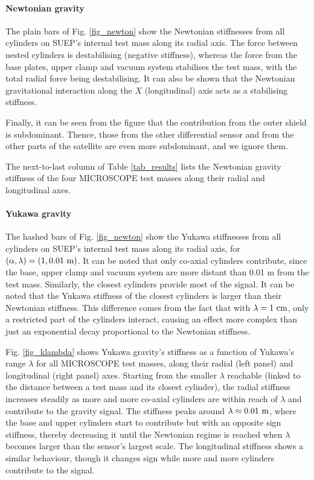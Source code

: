 \documentclass[12pt]{iopart}
\begin{document}
\paragraph{Newtonian gravity}

The plain bars of Fig. \ref{fig_newton} show the Newtonian stiffnesses from all cylinders on SUEP's internal test mass along its radial axis. The force between nested cylinders is destabilising (negative stiffness), whereas the force from the base plates, upper clamp and vacuum system stabilises the test mass, with the total radial force being destabilising. It can also be shown that the Newtonian gravitational interaction along the $X$ (longitudinal) axis acts as a stabilising stiffness.

Finally, it can be seen from the figure that the contribution from the outer shield is subdominant. Thence, those from  the other differential sensor and from the other parts of the satellite are even more subdominant, and we ignore them.


The next-to-last column of Table \ref{tab_results} lists the Newtonian gravity stiffness of the four MICROSCOPE test masses along their radial and longitudinal axes.




\paragraph{Yukawa gravity}

The hashed bars of Fig. \ref{fig_newton} show the Yukawa stiffnesses from all cylinders on SUEP's internal test mass along its radial axis, for $(\alpha, \lambda)=(1, 0.01~{\rm m})$. It can be noted that only co-axial cylinders contribute, since the base, upper clamp and vacuum system are more distant than 0.01 m from the test mass. Similarly, the closest cylinders provide most of the signal.
It can be noted that the Yukawa stiffness of the closest cylinders is larger than their Newtonian stiffness. This difference comes from the fact that with $\lambda=1~{\rm cm}$, only a restricted part of the cylinders interact, causing an effect more complex than just an exponential decay proportional to the Newtonian stiffness. 


Fig. \ref{fig_klambda} shows Yukawa gravity's stiffness as a function of Yukawa's range $\lambda$ for all MICROSCOPE test masses, along their radial (left panel) and longitudinal (right panel) axes. Starting from the smaller $\lambda$ reachable (linked to the distance between a test mass and its closest cylinder), the radial stiffness increases steadily as more and more co-axial cylinders are within reach of $\lambda$ and contribute to the gravity signal. The stiffness peaks around $\lambda \approx 0.01~{\rm m}$, where the base and upper cylinders start to contribute but with an opposite sign stiffness, thereby decreasing it until the Newtonian regime is reached when $\lambda$ becomes larger than the sensor's largest scale. The longitudinal stiffness shows a similar behaviour, though it changes sign while more and more cylinders contribute to the signal.
\end{document}
